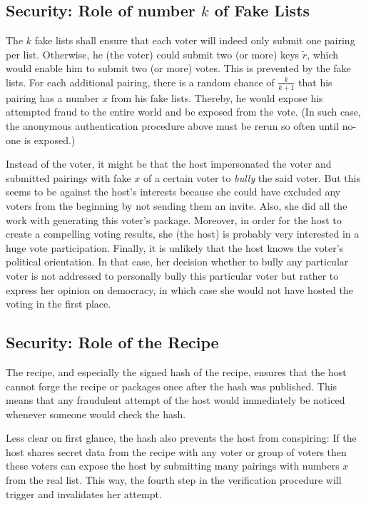 \documentclass{article}
\theoremstyle{definition}
\begin{document}
	\subsection{Security: Role of number $k$ of Fake Lists}
	The $k$ fake lists shall ensure that each voter will indeed only submit one pairing per list. Otherwise, he (the voter) could submit two (or more) keys $\tilde{r}$, which would enable him to submit two (or more) votes. This is prevented by the fake lists. For each additional pairing, there is a random chance of $\frac{k}{k+1}$ that his pairing has a number $x$ from his fake lists. Thereby, he would expose his attempted fraud to the entire world and be exposed from the vote. (In such case, the anonymous authentication procedure above must be rerun so often until no-one is exposed.)
	
	Instead of the voter, it might be that the host impersonated the voter and submitted pairings with fake $x$ of a certain voter to \emph{bully} the said voter. But this seems to be against the host's interests because she could have excluded any voters from the beginning by not sending them an invite. Also, she did all the work with generating this voter's package. Moreover, in order for the host to create a compelling voting results, she (the host) is probably very interested in a huge vote participation. Finally, it is unlikely that the host knows the voter's political orientation. In that case, her decision whether to bully any particular voter is not addressed to personally bully this particular voter but rather to express her opinion on democracy, in which case she would not have hosted the voting in the first place.
	
	\subsection{Security: Role of the Recipe}
	The recipe, and especially the signed hash of the recipe, ensures that the host cannot forge the recipe or packages once after the hash was published. This means that any fraudulent attempt of the host would immediately be noticed whenever someone would check the hash.
	
	Less clear on first glance, the hash also prevents the host from conspiring: If the host shares secret data from the recipe with any voter or group of voters then these voters can expose the host by submitting many pairings with numbers $x$ from the real list. This way, the fourth step in the verification procedure will trigger and invalidates her attempt.
	
\end{document}
